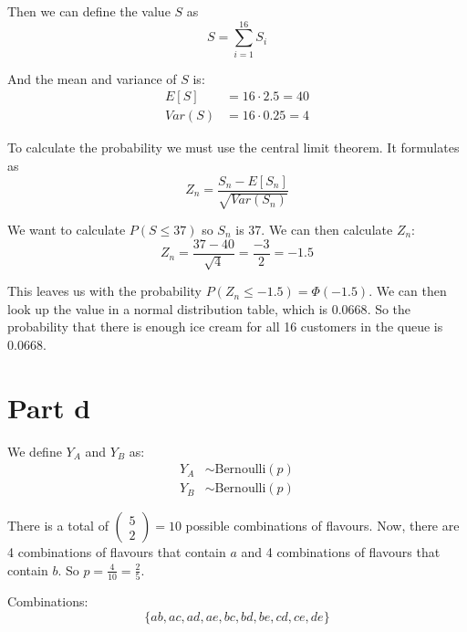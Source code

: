 Then we can define the value $S$ as
\[
	S = \sum^16_{i=1} S_i
\]

And the mean and variance of $S$ is:
\begin{align*}
	E[S]   & = 16 \cdot 2.5 = 40 \\
	Var(S) & = 16 \cdot 0.25 = 4
\end{align*}

To calculate the probability we must use the central limit theorem. It formulates as
\[
	Z_n = \frac{S_n - E[S_n]}{\sqrt{Var(S_n)}}
\]

We want to calculate $P(S\leq 37)$ so $S_n$ is 37. We can then calculate $Z_n$:
\[
	Z_n = \frac{37 - 40}{\sqrt{4}} = \frac{-3}{2} = -1.5
\]

This leaves us with the probability $P(Z_n \leq -1.5) = \Phi(-1.5)$. We can then look up the value in a normal distribution table, which is $0.0668$. So the probability that there is enough ice cream for all 16 customers in the queue is $0.0668$.

\section{Part d}

We define $Y_A$ and $Y_B$ as:
\begin{align*}
	Y_A & \sim \text{Bernoulli}(p) \\
	Y_B & \sim \text{Bernoulli}(p)
\end{align*}

There is a total of $\begin{pmatrix}5\\2\end{pmatrix} = 10$ possible combinations of flavours. Now, there are 4 combinations of flavours that contain $a$ and 4 combinations of flavours that contain $b$. So $p = \frac{4}{10} = \frac{2}{5}$.

Combinations:
\[
	\{ab, ac, ad, ae, bc, bd, be, cd, ce, de\}
\]

